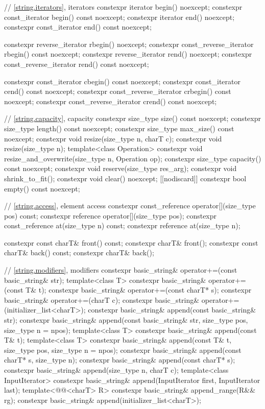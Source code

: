 \begin{codeblock}
{{    // \ref{string.iterators}, iterators
    constexpr iterator       begin() noexcept;
    constexpr const_iterator begin() const noexcept;
    constexpr iterator       end() noexcept;
    constexpr const_iterator end() const noexcept;

    constexpr reverse_iterator       rbegin() noexcept;
    constexpr const_reverse_iterator rbegin() const noexcept;
    constexpr reverse_iterator       rend() noexcept;
    constexpr const_reverse_iterator rend() const noexcept;

    constexpr const_iterator         cbegin() const noexcept;
    constexpr const_iterator         cend() const noexcept;
    constexpr const_reverse_iterator crbegin() const noexcept;
    constexpr const_reverse_iterator crend() const noexcept;

    // \ref{string.capacity}, capacity
    constexpr size_type size() const noexcept;
    constexpr size_type length() const noexcept;
    constexpr size_type max_size() const noexcept;
    constexpr void resize(size_type n, charT c);
    constexpr void resize(size_type n);
    template<class Operation> constexpr void resize_and_overwrite(size_type n, Operation op);
    constexpr size_type capacity() const noexcept;
    constexpr void reserve(size_type res_arg);
    constexpr void shrink_to_fit();
    constexpr void clear() noexcept;
    [[nodiscard]] constexpr bool empty() const noexcept;

    // \ref{string.access}, element access
    constexpr const_reference operator[](size_type pos) const;
    constexpr reference       operator[](size_type pos);
    constexpr const_reference at(size_type n) const;
    constexpr reference       at(size_type n);

    constexpr const charT& front() const;
    constexpr charT&       front();
    constexpr const charT& back() const;
    constexpr charT&       back();

    // \ref{string.modifiers}, modifiers
    constexpr basic_string& operator+=(const basic_string& str);
    template<class T>
      constexpr basic_string& operator+=(const T& t);
    constexpr basic_string& operator+=(const charT* s);
    constexpr basic_string& operator+=(charT c);
    constexpr basic_string& operator+=(initializer_list<charT>);
    constexpr basic_string& append(const basic_string& str);
    constexpr basic_string& append(const basic_string& str, size_type pos, size_type n = npos);
    template<class T>
      constexpr basic_string& append(const T& t);
    template<class T>
      constexpr basic_string& append(const T& t, size_type pos, size_type n = npos);
    constexpr basic_string& append(const charT* s, size_type n);
    constexpr basic_string& append(const charT* s);
    constexpr basic_string& append(size_type n, charT c);
    template<class InputIterator>
      constexpr basic_string& append(InputIterator first, InputIterator last);
    template<@@<charT> R>
      constexpr basic_string& append_range(R&& rg);
    constexpr basic_string& append(initializer_list<charT>);

}}
\end{codeblock}
